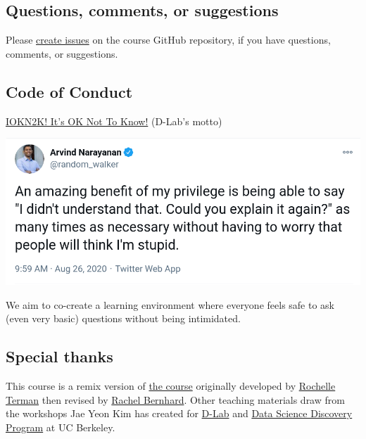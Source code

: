 \documentclass[
]{article}
\begin{document}
\hypertarget{questions-comments-or-suggestions}{%
\subsection{Questions, comments, or
suggestions}\label{questions-comments-or-suggestions}}

Please \href{https://github.com/PS239T/spring_2021/issues}{create
issues} on the course GitHub repository, if you have questions,
comments, or suggestions.

\hypertarget{code-of-conduct}{%
\subsection{Code of Conduct}\label{code-of-conduct}}

\href{https://dlab.berkeley.edu/blog/what-iokn2k}{IOKN2K! It's OK Not To
Know!} (D-Lab's motto)

\includegraphics{tweet_screenshot.png}

We aim to co-create a learning environment where everyone feels safe to
ask (even very basic) questions without being intimidated.

\hypertarget{special-thanks}{%
\subsection{Special thanks}\label{special-thanks}}

This course is a remix version of
\href{https://github.com/rochelleterman/PS239T}{the course} originally
developed by \href{http://rochelleterman.com/}{Rochelle Terman} then
revised by \href{http://rachelbernhard.com/}{Rachel Bernhard}. Other
teaching materials draw from the workshops Jae Yeon Kim has created for
\href{https://dlab.berkeley.edu/}{D-Lab} and
\href{https://data.berkeley.edu/research/discovery-program-home}{Data
Science Discovery Program} at UC Berkeley.
\end{document}
